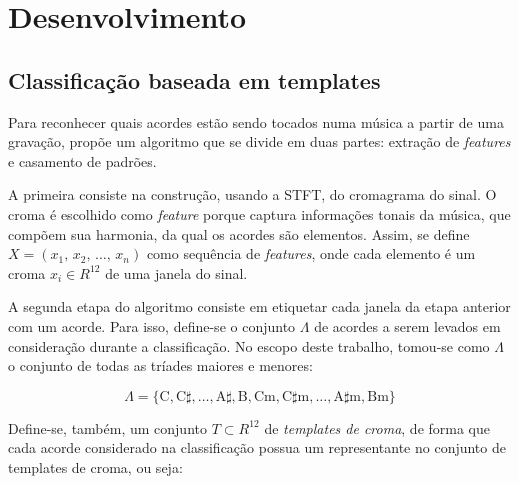 \chapter{Desenvolvimento}
\label{cap:desenvolvimento}

\section{Classificação baseada em templates}
\label{sec:classificador}
    
    Para reconhecer quais acordes estão sendo tocados numa música a partir de uma gravação, \cite{muller} propõe um algoritmo que se divide em duas partes: extração de \textit{features} e casamento de padrões.
    
    A primeira consiste na construção, usando a STFT, do cromagrama do sinal. O croma é escolhido como \textit{feature} porque captura informações tonais da música, que compõem sua harmonia, da qual os acordes são elementos. Assim, se define $X = (x_1\textrm{, }x_2\textrm{, }\dots\textrm{, }x_n)$ como sequência de \textit{features}, onde cada elemento é um croma $x_i \in R^{12}$ de uma janela do sinal.
    
    A segunda etapa do algoritmo consiste em etiquetar cada janela da etapa anterior com um acorde. Para isso, define-se o conjunto $\Lambda$ de acordes a serem levados em consideração durante a classificação. No escopo deste trabalho, tomou-se como $\Lambda$ o conjunto de todas as tríades maiores e menores:
    
    \begin{equation}\label{Lambda}
        \Lambda = \{
            \textrm{C},
            \textrm{C}\sharp,
            \dots,
            \textrm{A}\sharp,
            \textrm{B},
            \textrm{Cm},
            \textrm{C}\sharp\textrm{m},
            \dots,
            \textrm{A}\sharp\textrm{m},
            \textrm{Bm}
        \}
    \end{equation}
    
    Define-se, também, um conjunto $T \subset R^{12}$ de \textit{templates de croma}, de forma que cada acorde considerado na classificação possua um representante no conjunto de templates de croma, ou seja:
    
